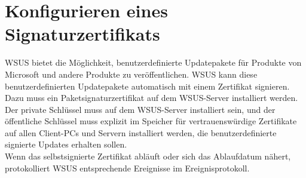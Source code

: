 \documentclass{preset/school}
\begin{document}
\section{Konfigurieren eines Signaturzertifikats}
WSUS bietet die Möglichkeit, benutzerdefinierte Updatepakete für Produkte von Microsoft und andere Produkte zu veröffentlichen.
WSUS kann diese benutzerdefinierten Updatepakete automatisch mit einem Zertifikat signieren. Dazu muss ein Paketsignaturzertifikat auf dem WSUS-Server installiert werden.
\\\vspace{0.5 em}
Der private Schlüssel muss auf dem WSUS-Server installiert sein, und der öffentliche Schlüssel muss explizit im Speicher für vertrauenswürdige Zertifikate auf allen Client-PCs und Servern installiert werden, die benutzerdefinierte signierte Updates erhalten sollen.
\\\vspace{0.5 em}
Wenn das selbstsignierte Zertifikat abläuft oder sich das Ablaufdatum nähert, protokolliert WSUS entsprechende Ereignisse im Ereignisprotokoll.
\end{document}
